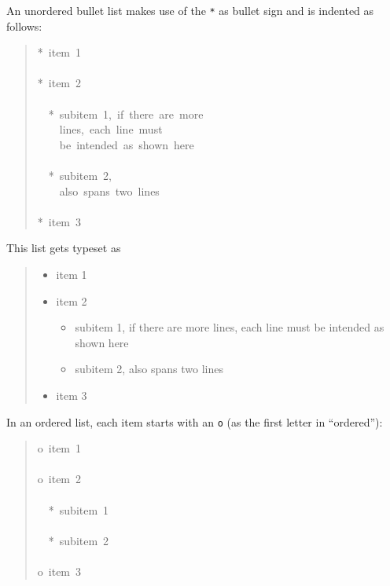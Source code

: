\documentclass[a4paper]{article}
\begin{document}
An unordered bullet list makes use of the \texttt{*} as bullet sign
and is indented as follows:
%
\begin{quote}{\ttfamily \raggedright \noindent
*~item~1\\
~\\
*~item~2\\
~\\
~~*~subitem~1,~if~there~are~more\\
~~~~lines,~each~line~must\\
~~~~be~intended~as~shown~here\\
~\\
~~*~subitem~2,\\
~~~~also~spans~two~lines\\
~\\
*~item~3
}
\end{quote}

This list gets typeset as
%
\begin{quote}
%
\begin{itemize}

\item item 1

\item item 2
%
\begin{itemize}

\item subitem 1, if there are more
lines, each line must
be intended as shown here

\item subitem 2,
also spans two lines

\end{itemize}

\item item 3

\end{itemize}

\end{quote}

In an ordered list, each item starts with an \texttt{o} (as the first letter
in ``ordered''):
%
\begin{quote}{\ttfamily \raggedright \noindent
o~item~1\\
~\\
o~item~2\\
~\\
~~*~subitem~1\\
~\\
~~*~subitem~2\\
~\\
o~item~3
}
\end{quote}
\end{document}
